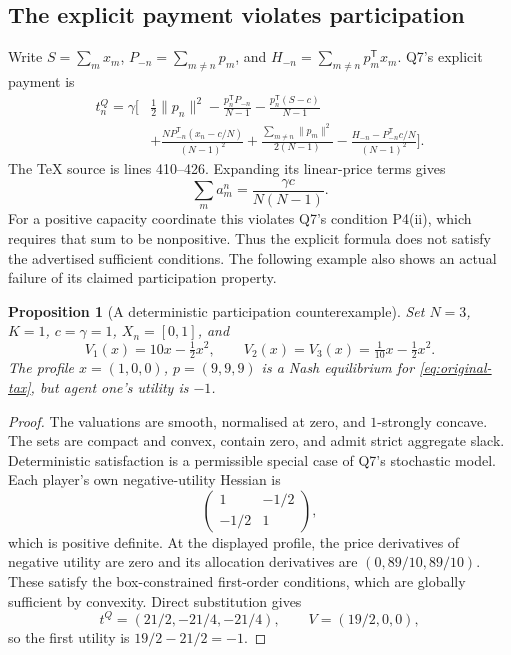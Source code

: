 \documentclass[11pt,a4paper]{article}
\newtheorem{proposition}{Proposition}
\begin{document}
\subsection{The explicit payment violates participation}

Write $S=\sum_m x_m$, $P_{-n}=\sum_{m\ne n}p_m$, and
$H_{-n}=\sum_{m\ne n}p_m^{\mathsf T}x_m$. Q7's explicit payment is
\begin{align}
 t_n^Q=\gamma\bigg[&\frac12\|p_n\|^2
 -\frac{p_n^{\mathsf T}P_{-n}}{N-1}
 -\frac{p_n^{\mathsf T}(S-c)}{N-1}\nonumber\\
 &+\frac{N P_{-n}^{\mathsf T}(x_n-c/N)}{(N-1)^2}
 +\frac{\sum_{m\ne n}\|p_m\|^2}{2(N-1)}
 -\frac{H_{-n}-P_{-n}^{\mathsf T}c/N}{(N-1)^2}\bigg].
 \label{eq:original-tax}
\end{align}
The TeX source is lines 410--426. Expanding its linear-price terms gives
\begin{equation}
 \sum_m a_m^n=\frac{\gamma c}{N(N-1)}.
 \label{eq:failed-participation-condition}
\end{equation}
For a positive capacity coordinate this violates Q7's condition P4(ii),
which requires that sum to be nonpositive. Thus the explicit formula does
not satisfy the advertised sufficient conditions. The following example
also shows an actual failure of its claimed participation property.

\begin{proposition}[A deterministic participation counterexample]
Set $N=3$, $K=1$, $c=\gamma=1$, $X_n=[0,1]$, and
\begin{equation}
 V_1(x)=10x-\tfrac12x^2,\qquad
 V_2(x)=V_3(x)=\tfrac1{10}x-\tfrac12x^2.
 \label{eq:counter-valuations}
\end{equation}
The profile $x=(1,0,0)$, $p=(9,9,9)$ is a Nash equilibrium for
\eqref{eq:original-tax}, but agent one's utility is $-1$.
\end{proposition}
\begin{proof}
The valuations are smooth, normalised at zero, and $1$-strongly concave.
The sets are compact and convex, contain zero, and admit strict aggregate
slack. Deterministic satisfaction is a permissible special case of Q7's
stochastic model. Each player's own negative-utility Hessian is
\begin{equation}
 \begin{pmatrix}1&-1/2\\-1/2&1\end{pmatrix},
\end{equation}
which is positive definite. At the displayed profile, the price derivatives
of negative utility are zero and its allocation derivatives are
$(0,89/10,89/10)$. These satisfy the box-constrained first-order conditions,
which are globally sufficient by convexity. Direct substitution gives
\begin{equation}
 t^Q=(21/2,-21/4,-21/4),\qquad V=(19/2,0,0),
\end{equation}
so the first utility is $19/2-21/2=-1$.
\end{proof}
\end{document}
